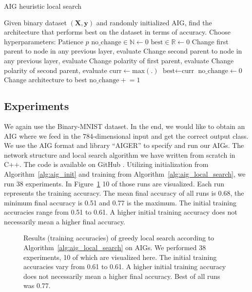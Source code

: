 \begin{algorithm}
  \caption{AIG heuristic local search}
  \label{alg:aig_local_search}
  \begin{algorithmic}
    \State Given binary dataset $(\boldsymbol{X}, \bm{y})$ and randomly initialized AIG, find the architecture that performs best on the dataset in terms of accuracy.
    \vspace{1em}
    \State Choose hyperparameters:
      \Statein Patience $p$
    \State $\text{no\_change} \in \mathds{N} \gets 0$
    \State $\text{best} \in \mathds{R} \gets 0$
        \State Change first parent to node in any previous layer, evaluate
        \State Change second parent to node in any previous layer, evaluate
        \State Change polarity of first parent, evaluate
        \State Change polarity of second parent, evaluate
    \EndFor
    \State $\text{curr} \gets \text{max}(.)$
      \State $\text{best} \gets \text{curr}$
      \State $\text{no\_change} \gets 0$
      \State Change architecture to best
    \Else
      \State $\text{no\_change} \mathrel{+}= 1$
    \EndIf
  \EndWhile
  \end{algorithmic}
\end{algorithm}
\FloatBarrier

\subsection{Experiments}
We again use the Binary-MNIST dataset. In the end, we would like to obtain an AIG where we feed in the 784-dimensional input and get the correct output class. We use the AIG format and library \enquote{AIGER} \cite{bib:Biere-FMV-TR-07-1} to specify and run our AIGs. The network structure and local search algorithm we have written from scratch in C++. The code is available on GitHub \cite{bib:aig_github}. Utilizing initialization from Algorithm~\ref{alg:aig_init} and training from Algorithm~\ref{alg:aig_local_search}, we run 38 experiments. In Figure~\ref{fig:aig_exp_result} 10 of those runs are visualized. Each run represents the training accuracy. The mean final accuracy of all runs is 0.68, the minimum final accuracy is 0.51 and 0.77 is the maximum. The initial training accuracies range from 0.51 to 0.61. A higher initial training accuracy does not necessarily mean a higher final accuracy.

\begin{figure}[!htb]
    \centering
      
      \caption{Results (training accuracies) of greedy local search according to Algorithm~\ref{alg:aig_local_search} on AIGs. We performed 38 experiments, 10 of which are visualized here. The initial training accuracies vary from 0.61 to 0.61. A higher initial training accuracy does not necessarily mean a higher final accuracy. Best of all runs was 0.77.}
\label{fig:aig_exp_result}
\end{figure}
\FloatBarrier

